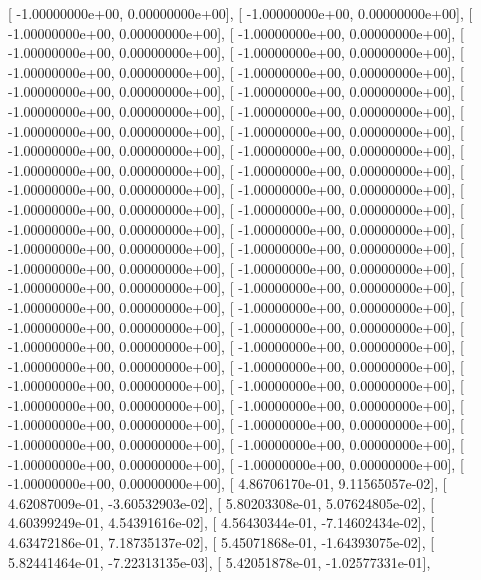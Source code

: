 \documentclass{article}
\begin{document}
       [ -1.00000000e+00,   0.00000000e+00],
       [ -1.00000000e+00,   0.00000000e+00],
       [ -1.00000000e+00,   0.00000000e+00],
       [ -1.00000000e+00,   0.00000000e+00],
       [ -1.00000000e+00,   0.00000000e+00],
       [ -1.00000000e+00,   0.00000000e+00],
       [ -1.00000000e+00,   0.00000000e+00],
       [ -1.00000000e+00,   0.00000000e+00],
       [ -1.00000000e+00,   0.00000000e+00],
       [ -1.00000000e+00,   0.00000000e+00],
       [ -1.00000000e+00,   0.00000000e+00],
       [ -1.00000000e+00,   0.00000000e+00],
       [ -1.00000000e+00,   0.00000000e+00],
       [ -1.00000000e+00,   0.00000000e+00],
       [ -1.00000000e+00,   0.00000000e+00],
       [ -1.00000000e+00,   0.00000000e+00],
       [ -1.00000000e+00,   0.00000000e+00],
       [ -1.00000000e+00,   0.00000000e+00],
       [ -1.00000000e+00,   0.00000000e+00],
       [ -1.00000000e+00,   0.00000000e+00],
       [ -1.00000000e+00,   0.00000000e+00],
       [ -1.00000000e+00,   0.00000000e+00],
       [ -1.00000000e+00,   0.00000000e+00],
       [ -1.00000000e+00,   0.00000000e+00],
       [ -1.00000000e+00,   0.00000000e+00],
       [ -1.00000000e+00,   0.00000000e+00],
       [ -1.00000000e+00,   0.00000000e+00],
       [ -1.00000000e+00,   0.00000000e+00],
       [ -1.00000000e+00,   0.00000000e+00],
       [ -1.00000000e+00,   0.00000000e+00],
       [ -1.00000000e+00,   0.00000000e+00],
       [ -1.00000000e+00,   0.00000000e+00],
       [ -1.00000000e+00,   0.00000000e+00],
       [ -1.00000000e+00,   0.00000000e+00],
       [ -1.00000000e+00,   0.00000000e+00],
       [ -1.00000000e+00,   0.00000000e+00],
       [ -1.00000000e+00,   0.00000000e+00],
       [ -1.00000000e+00,   0.00000000e+00],
       [ -1.00000000e+00,   0.00000000e+00],
       [ -1.00000000e+00,   0.00000000e+00],
       [ -1.00000000e+00,   0.00000000e+00],
       [ -1.00000000e+00,   0.00000000e+00],
       [ -1.00000000e+00,   0.00000000e+00],
       [ -1.00000000e+00,   0.00000000e+00],
       [ -1.00000000e+00,   0.00000000e+00],
       [ -1.00000000e+00,   0.00000000e+00],
       [ -1.00000000e+00,   0.00000000e+00],
       [ -1.00000000e+00,   0.00000000e+00],
       [ -1.00000000e+00,   0.00000000e+00],
       [  4.86706170e-01,   9.11565057e-02],
       [  4.62087009e-01,  -3.60532903e-02],
       [  5.80203308e-01,   5.07624805e-02],
       [  4.60399249e-01,   4.54391616e-02],
       [  4.56430344e-01,  -7.14602434e-02],
       [  4.63472186e-01,   7.18735137e-02],
       [  5.45071868e-01,  -1.64393075e-02],
       [  5.82441464e-01,  -7.22313135e-03],
       [  5.42051878e-01,  -1.02577331e-01],
\end{document}
